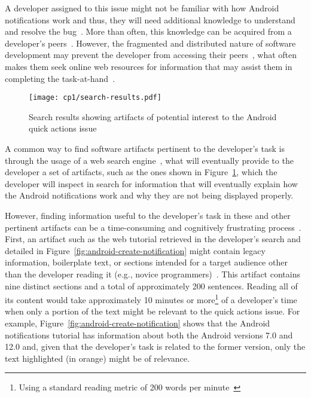  
 \medskip
 A developer assigned to this issue might not be familiar with how Android notifications work and thus, they will need additional knowledge to understand and resolve the bug~\cite{ko2007, Li2013, sillito2006}. 
 More than often, this knowledge can be acquired from a developer's peers~\cite{singer2011}. 
 However, the fragmented and distributed nature of software development  
 may prevent the developer from accessing their peers~\cite{ko2007},
 what often makes  them seek online web resources for information 
 that may assist them in completing the task-at-hand~\cite{Xia2017, rao2020}.
 
 
 
 
 
 \begin{figure}
     \centering
     \texttt{[image: cp1/search-results.pdf]}
     \caption{Search results showing artifacts of potential interest to the Android quick actions issue}
     \label{fig:android-search-results}
 \end{figure}
 
 
 
 A common way to find software artifacts
 pertinent to the developer's task
 is through the usage of a web search engine~\cite{Brandt2009a, Li2013},
 what will eventually provide to the developer 
 a set of artifacts, such as the ones shown in 
 Figure~\ref{fig:android-search-results}, which the 
 developer will inspect in search for information 
 that will eventually explain how the Android notifications 
 work and why they are not being displayed properly. 
 
 
 
 
 However, finding information useful to the developer's task 
  in these and other 
 pertinent artifacts can be a time-consuming
 and cognitively frustrating process~\cite{Begel2008,
 robillard2011field}.
 First, an artifact such as the web tutorial retrieved in the developer's search 
 and detailed in Figure~\ref{fig:android-create-notification}
 might contain legacy information, boilerplate text, or sections 
 intended for a target audience other than the developer reading it (e.g., novice programmers)~\cite{Robillard2015}.
 This artifact contains nine distinct sections and a total of approximately 200 sentences.
 Reading all of its content would take approximately 10 minutes or more\footnote{Using a standard reading metric of 200 words per minute~\cite{Just1980}} of a developer's time~\cite{endrikat2014, Meyer2017} when only a portion of the text 
 might be relevant to the quick actions issue. For example, 
 Figure~\ref{fig:android-create-notification} shows
 that the Android notifications tutorial 
 has information about both the Android versions 7.0 and 12.0 and, given that the developer's task is related to the former version, only the text highlighted (in orange)
 might be of relevance.
 
